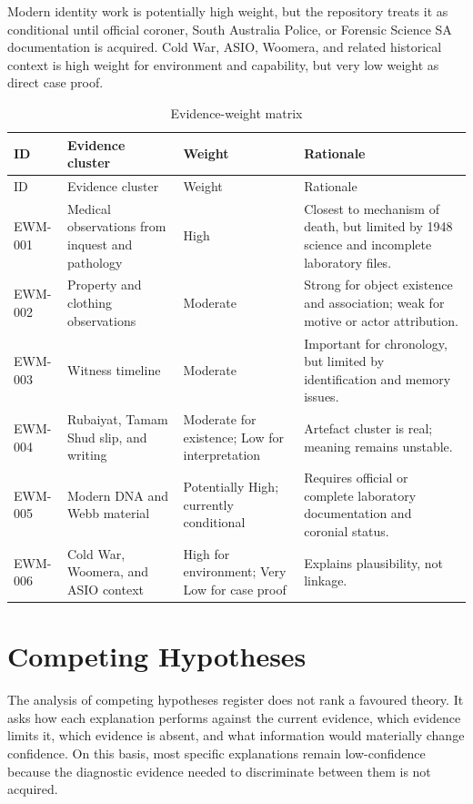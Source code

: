 Modern identity work is potentially high weight, but the repository treats it as conditional until official coroner, South Australia Police, or Forensic Science SA documentation is acquired. Cold War, ASIO, Woomera, and related historical context is high weight for environment and capability, but very low weight as direct case proof.

\begingroup
\scriptsize
\setlength{\tabcolsep}{2pt}
\renewcommand{\arraystretch}{1.12}
\begin{longtable}{>{\raggedright\arraybackslash}p{}>{\raggedright\arraybackslash}p{}>{\raggedright\arraybackslash}p{}>{\raggedright\arraybackslash}p{}}
\caption{Evidence-weight matrix}\label{tab:chapter10-evidence-weight}\\
\toprule
ID & Evidence cluster & Weight & Rationale \\
\midrule
\endfirsthead
\toprule
ID & Evidence cluster & Weight & Rationale \\
\midrule
\endhead
EWM-001 & Medical observations from inquest and pathology & High & Closest to mechanism of death, but limited by 1948 science and incomplete laboratory files. \\
EWM-002 & Property and clothing observations & Moderate & Strong for object existence and association; weak for motive or actor attribution. \\
EWM-003 & Witness timeline & Moderate & Important for chronology, but limited by identification and memory issues. \\
EWM-004 & Rubaiyat, Tamam Shud slip, and writing & Moderate for existence; Low for interpretation & Artefact cluster is real; meaning remains unstable. \\
EWM-005 & Modern DNA and Webb material & Potentially High; currently conditional & Requires official or complete laboratory documentation and coronial status. \\
EWM-006 & Cold War, Woomera, and ASIO context & High for environment; Very Low for case proof & Explains plausibility, not linkage. \\
\bottomrule
\end{longtable}
\endgroup

\section{Competing Hypotheses}

The analysis of competing hypotheses register does not rank a favoured theory. It asks how each explanation performs against the current evidence, which evidence limits it, which evidence is absent, and what information would materially change confidence. On this basis, most specific explanations remain low-confidence because the diagnostic evidence needed to discriminate between them is not acquired.

